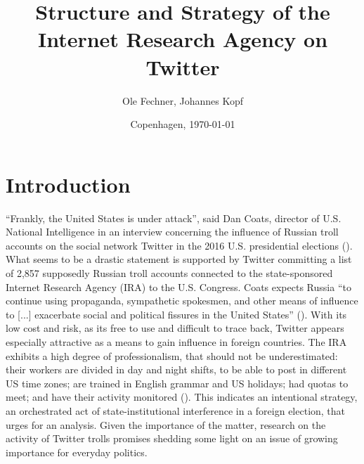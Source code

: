 \documentclass[12pt, titlepage=true, toc=bib]{scrartcl}
\begin{document}
\titlehead{}
\author{Ole Fechner, Johannes Kopf}
\title{Structure and Strategy of the Internet Research Agency on Twitter}


\date{\normalsize{Copenhagen, \today}}

\publishers{}

\maketitle[0]

\newpage

\thispagestyle{empty}
\tableofcontents

\newpage

\thispagestyle{empty}
\listoftables

\newpage

\thispagestyle{empty}
\listoffigures

\newpage
\setcounter{page}{1}

\section{Introduction}

``Frankly, the United States is under attack'', said Dan Coats, director of U.S. National Intelligence in an interview concerning the influence of Russian troll accounts on the social network Twitter in the 2016 U.S. presidential elections (\cite{popken_twitter_2018}). What seems to be a drastic statement is supported by Twitter committing a list of 2,857 supposedly Russian troll accounts connected to the state-sponsored Internet Research Agency (IRA) to the U.S. Congress. Coats expects Russia ``to continue using propaganda, sympathetic spokesmen, and other means of influence to [...] exacerbate social and political fissures in the United States'' (\cite{popken_twitter_2018}). With its low cost and risk, as its free to use and difficult to trace back, Twitter appears especially attractive as a means to gain influence in foreign countries. The IRA exhibits a high degree of professionalism, that should not be underestimated: their workers are divided in day and night shifts, to be able to post in different US time zones; are trained in English grammar and US holidays; had quotas to meet; and have their activity monitored (\cite{kirby_what_2018}). This indicates an intentional strategy, an orchestrated act of state-institutional interference in a foreign election, that urges for an analysis. Given the importance of the matter, research on the activity of Twitter trolls promises shedding some light on an issue of growing importance for everyday politics.
\end{document}
